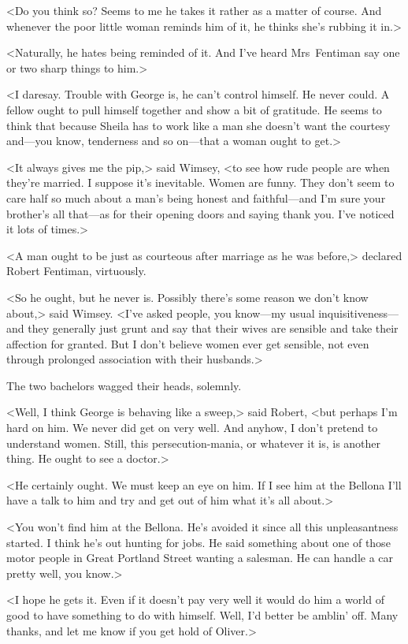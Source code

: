 <Do you think so? Seems to me he takes it rather as a matter of course. And whenever the poor little woman reminds him of it, he thinks she's rubbing it in.>

<Naturally, he hates being reminded of it. And I've heard Mrs~Fentiman say one or two sharp things to him.>

<I daresay. Trouble with George is, he can't control himself. He never could. A fellow ought to pull himself together and show a bit of gratitude. He seems to think that because Sheila has to work like a man she doesn't want the courtesy and—you know, tenderness and so on—that a woman ought to get.>

<It always gives me the pip,> said Wimsey, <to see how rude people are when they're married. I suppose it's inevitable. Women are funny. They don't seem to care half so much about a man's being honest and faithful—and I'm sure your brother's all that—as for their opening doors and saying thank you. I've noticed it lots of times.>

<A man ought to be just as courteous after marriage as he was before,> declared Robert Fentiman, virtuously.

<So he ought, but he never is. Possibly there's some reason we don't know about,> said Wimsey. <I've asked people, you know—my usual inquisitiveness—and they generally just grunt and say that their wives are sensible and take their affection for granted. But I don't believe women ever get sensible, not even through prolonged association with their husbands.>

The two bachelors wagged their heads, solemnly.

<Well, I think George is behaving like a sweep,> said Robert, <but perhaps I'm hard on him. We never did get on very well. And anyhow, I don't pretend to understand women. Still, this persecution-mania, or whatever it is, is another thing. He ought to see a doctor.>

<He certainly ought. We must keep an eye on him. If I see him at the Bellona I'll have a talk to him and try and get out of him what it's all about.>

<You won't find him at the Bellona. He's avoided it since all this unpleasantness started. I think he's out hunting for jobs. He said something about one of those motor people in Great Portland Street wanting a salesman. He can handle a car pretty well, you know.>

<I hope he gets it. Even if it doesn't pay very well it would do him a world of good to have something to do with himself. Well, I'd better be amblin' off. Many thanks, and let me know if you get hold of Oliver.>

